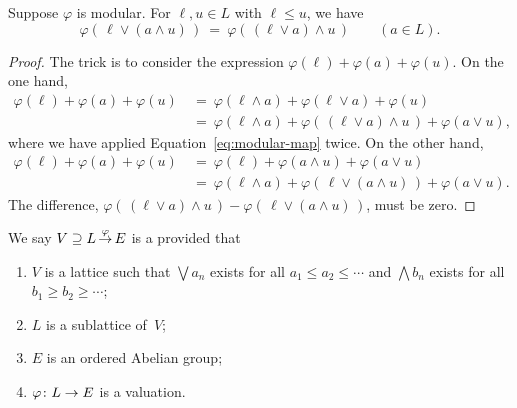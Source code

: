 \documentclass[main.tex]{subfiles}
\begin{document}
\begin{lem}
\label{L:modular-map-modular}
Suppose $\varphi$ is modular.
For $\ell,u\in L$ with $\ell\leq u$, we have
\begin{equation}
\label{eq:modular-map}
\varphi(\,\ell \vee (a \wedge u)\,) 
\ =\ 
\varphi(\,(\ell\vee a)\wedge u\,)
\qquad (a\in L).
\end{equation}
\begin{proof}
The trick is to consider the expression 
$\varphi(\ell) + \varphi(a) + \varphi(u)$.
On the one hand,
\begin{align*}
\varphi(\ell) + \varphi(a) + \varphi(u)
\ &=\ \varphi(\ell\wedge a) + \varphi(\ell \vee a) + \varphi(u) \\
\ &=\ \varphi(\ell \wedge a)
      + \varphi(\,(\ell\vee a)\wedge u\,)
      + \varphi(a\vee u),
\end{align*}
where we have applied Equation~\eqref{eq:modular-map} twice.
On the other hand,
\begin{align*}
\varphi(\ell) + \varphi(a) + \varphi(u)
\ &=\ \varphi(\ell) + \varphi(a\wedge u) + \varphi(a \vee u) \\
\ &=\ \varphi(\ell \wedge a)
      + \varphi(\,\ell\vee (a\wedge u)\,)
      + \varphi(a\vee u).
\end{align*}
The difference,
$\varphi(\,(\ell\vee a)\wedge u\,)
- \varphi(\,\ell\vee (a\wedge u)\,)$,
must be zero.
\end{proof}

\end{lem}

%
%
\begin{dfn}
We say $V \supseteq L\,\smash{\stackrel{\varphi}{\rightarrow}}\,E$
 is a 
provided that
\begin{enumerate}
\item
$V$ is a lattice such that
$\bigvee a_n$ exists for all $a_1 \leq a_2 \leq \dotsb$
and $\bigwedge b_n$ exists for all $b_1 \geq b_2 \geq \dotsb$;

\item
$L$ is a sublattice of~$V$;

\item
$E$ is an ordered Abelian group;

\item
$\varphi\colon L \rightarrow E$ is a valuation.
\end{enumerate}
\end{dfn}
\end{document}
